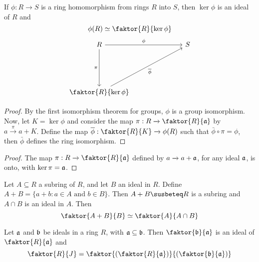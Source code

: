 \begin{theorem}\label{1.3.4}
    If $\phi:R \xrightarrow{} S$ is a ring homomorphism from rings $R$ into $S$,
    then $\ker{\phi}$ is an ideal of $R$ and
    \begin{equation*}
        \phi(R) \simeq \faktor{R}{\ker{\phi}}
    \end{equation*}
    \[\begin{tikzcd}
        R &&& S \\
        \\
        \\
        {\faktor{R}{\ker{\phi}}}
        \arrow["\pi"', from=1-1, to=4-1]
        \arrow["\phi", from=1-1, to=1-4]
        \arrow["{\bar{\phi}}"', from=4-1, to=1-4]
    \end{tikzcd}\]
\end{theorem}
\begin{proof}
    By the first isomorphism theorem for groups, $\phi$ is a group isomorphism.
    Now, let $K=\ker{\phi}$ and consider the map $\pi:R \xrightarrow{}
    \faktor{R}{\af}$ by $a \xrightarrow{\pi} a+K$. Define the map
    $\bar{\phi}:\faktor{R}{K} \xrightarrow{} \phi(R)$ such that $\bar{\phi}
    \circ \pi=\phi$, then $\bar{\phi}$ defines the ring isomorphism.
\end{proof}
\begin{proof}
    The map $\pi:R \xrightarrow{} \faktor{R}{\af}$ defined by $a \xrightarrow{}
    a+\af$, for any ideal $\af$, is onto, with $\ker{\pi}=\af$.
\end{proof}

\begin{theorem}\label{1.3.5}
    Let $A \subseteq R$ a subring of  $R$, and let  $B$ an ideal in  $R$. Define
     $A+B=\{a+b : a \in A \text{ and } b \in B\}$. Then $A+B \susbeteq R$ is a
     subring and  $A \cap B$ is an ideal in $A$. Then
     \begin{equation*}
         \faktor{A+B}{B} \simeq \faktor{A}{A \cap B}
     \end{equation*}
\end{theorem}

\begin{theorem}\label{1.3.6}
    Let $\af$ and  $\bf$ be ideals in a ring  $R$, with  $\af \subseteq \bf$. Then
    $\faktor{\bf}{\af}$ is an ideal of $\faktor{R}{\af}$ and
    \begin{equation*}
        \faktor{R}{J}=\faktor{(\faktor{R}{\af})}{(\faktor{\bf}{\af})}
    \end{equation*}
\end{theorem}

